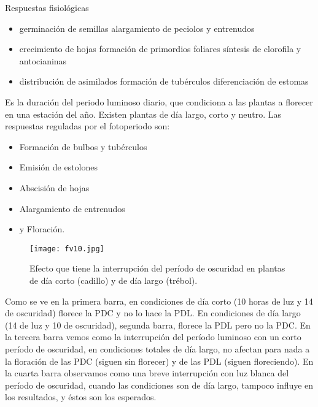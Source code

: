Respuestas fisiológicas
\begin{itemize}
    \item germinación de semillas alargamiento de peciolos y entrenudos
    \item crecimiento de hojas formación de primordios foliares síntesis de clorofila y antocianinas
    \item distribución de asimilados formación de tubérculos diferenciación de estomas
\end{itemize}

\begin{definition}[Fotoperiodo]
    Es la duración del periodo luminoso diario, que condiciona a las plantas a florecer en una estación del año.
    Existen plantas de día largo, corto y neutro. Las respuestas reguladas por el fotoperiodo son:
    \begin{itemize}
        \item Formación de bulbos y tubérculos
        \item Emisión de estolones
        \item Abscisión de hojas
        \item Alargamiento de entrenudos
        \item y Floración.
    \end{itemize}
\end{definition}

\begin{figure}[h!]
\centering
  \texttt{[image: fv10.jpg]}
  \caption{Efecto que tiene la interrupción del período de oscuridad en plantas de día corto (cadillo) y de día largo (trébol).}
  \label{fv10}
\end{figure}

Como se ve en la primera barra, en condiciones de día corto (10 horas de luz y 14 de oscuridad) florece la PDC y no lo hace la  PDL. En  condiciones de día largo (14 de luz y 10 de oscuridad), segunda barra, florece la PDL pero no la PDC. En la tercera barra vemos como la interrupción del período luminoso con un corto período de oscuridad, en condiciones totales de día largo, no afectan para nada a la floración de las PDC (siguen sin florecer) y de las PDL (siguen floreciendo). En la cuarta barra observamos como una breve interrupción con luz blanca del período de oscuridad, cuando las condiciones son de día largo, tampoco influye en los resultados, y éstos son los esperados. 

